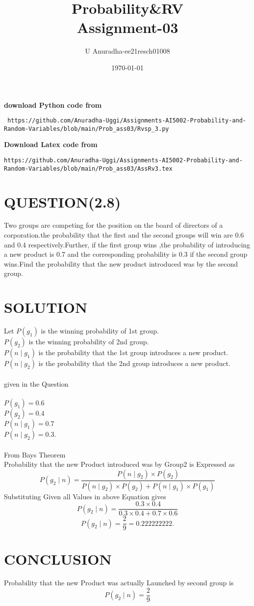 \documentclass[journal,12pt,twocolumn]{IEEEtran}
\title{Probability\&RV \\ Assignment-03}
\author{U Anuradha-ee21resch01008}
\date{\today}
\begin{document}
\maketitle
\newpage
\bigskip
\renewcommand{\thefigure}{\theenumi}
\renewcommand{\thetable}{\theenumi}
\textbf{download Python code from}
\begin{lstlisting}
 https://github.com/Anuradha-Uggi/Assignments-AI5002-Probability-and-Random-Variables/blob/main/Prob_ass03/Rvsp_3.py
\end{lstlisting}
\textbf{Download Latex code from}
\begin{lstlisting}
https://github.com/Anuradha-Uggi/Assignments-AI5002-Probability-and-Random-Variables/blob/main/Prob_ass03/AssRv3.tex
\end{lstlisting}
\section{QUESTION(2.8)}
Two groups are competing for the position on the board of directors of a corporation.the probability that the first and the second groups will win are 0.6 and 0.4 respectively.Further, if the first group wins ,the probability of introducing a new product is 0.7 and the corresponding probability is 0.3 if the second group wins.Find the probability that the new product introduced was by the second group.
\section{SOLUTION}
Let $P(g_1)$ is the winning probability of 1st group.\\
    $P(g_2)$ is the winning probability of 2nd group.\\
    $P(n\mid g_1)$ is the probability that the 1st group introduces a new product.\\
    $P(n\mid g_2)$ is the probability that the 2nd group introduces a new product.\\
    \\given in the Question\\ \\
    $P(g_1)=0.6$\\
     $P(g_2)=0.4$\\
     $P(n\mid g_1)=0.7$\\
     $P(n\mid g_2)=0.3$.\\ \\
     From Bays Theorem \\
     Probability that the new Product introduced was by Group2 is Expressed as
\begin{equation*}
   P(g_2\mid n)=\frac{P(n\mid g_2)\times P(g_2)}{{P(n\mid g_2)\times P(g_2)}+{P(n\mid g_1)\times P(g_1)}}
\end{equation*}
Substituting Given all Values in above Equation gives
\begin{equation*}
    P(g_2\mid n)=\frac{0.3\times 0.4}{{0.3\times 0.4}+{0.7\times 0.6}}
\end{equation*}
\begin{equation*}
    P(g_2\mid n)=\frac{2}{9}=0.222222222.
\end{equation*}
\section{CONCLUSION}
Probability that the new Product was actually Launched by second group is 
\begin{equation*}
   P(g_2\mid n)=\frac{2}{9}
\end{equation*}
\end{document}
